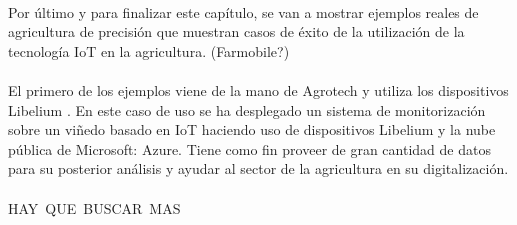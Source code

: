 \documentclass[../../memoria.tex]{subfiles}
\begin{document}
\paragraph{}
Por último y para finalizar este capítulo, se van a mostrar ejemplos reales de agricultura de precisión que muestran casos de éxito de la utilización de la tecnología IoT en la agricultura.
(Farmobile?)

\paragraph{}
El primero de los ejemplos viene de la mano de Agrotech y utiliza los dispositivos Libelium \cite{libeliumusecase1}. En este caso de uso se ha desplegado un sistema de monitorización sobre un viñedo basado en IoT haciendo uso de dispositivos Libelium y la nube pública de Microsoft: Azure. Tiene como fin proveer de gran cantidad de datos para su posterior análisis y ayudar al sector de la agricultura en su digitalización.

\paragraph{}
HAY\
QUE\
BUSCAR\
MAS
\end{document}
